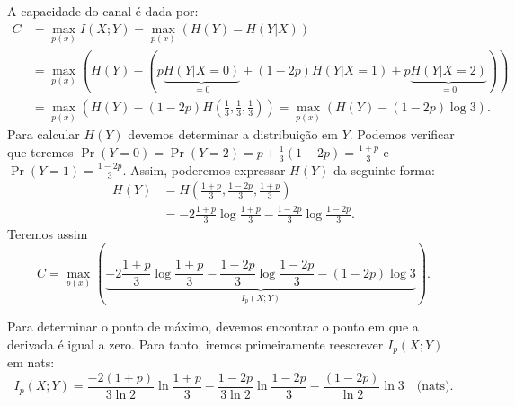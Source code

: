 \begin{questions}
\begin{solution}
A capacidade do canal é dada por:
\begin{align}
C &= \max_{p(x)} I(X;Y) = \max_{p(x)} \left( H(Y) - H(Y|X) \right) \nonumber \\
  &= \max_{p(x)} \left( H(Y) - \left( p\underbrace{H(Y|X=0)}_{=0} + (1-2p)H(Y|X=1) + p\underbrace{H(Y|X=2)}_{=0} \right) \right) \nonumber \\
  &= \max_{p(x)} \left( H(Y) - (1-2p) H\left(\frac{1}{3},\frac{1}{3},\frac{1}{3}\right) \right) = \max_{p(x)} \left( H(Y) - (1-2p) \log 3 \right) .
\end{align}
Para calcular $H(Y)$ devemos determinar a distribuição em $Y$. Podemos verificar que
teremos $\Pr(Y=0)=\Pr(Y=2)=p+\frac{1}{3}(1-2p)=\frac{1+p}{3}$ e $\Pr(Y=1)=\frac{1-2p}{3}$. Assim, poderemos
expressar $H(Y)$ da seguinte forma:
\begin{align}
H(Y) &= H\left( \frac{1+p}{3}, \frac{1-2p}{3}, \frac{1+p}{3} \right) \nonumber \\
     &= - 2 \frac{1+p}{3} \log \frac{1+p}{3} - \frac{1-2p}{3} \log \frac{1-2p}{3} .
\end{align}
Teremos assim
\begin{equation}
C = \max_{p(x)} \left( \underbrace{ - 2 \frac{1+p}{3} \log \frac{1+p}{3} - \frac{1-2p}{3} \log \frac{1-2p}{3} - (1-2p) \log 3 }_{I_p(X;Y)} \right) .
\end{equation}

Para determinar o ponto de máximo, devemos encontrar o ponto em que a derivada é igual a zero. Para tanto, iremos
primeiramente reescrever $I_p(X;Y)$ em nats:
\begin{equation}
I_p(X;Y) = \frac{-2(1+p)}{3 \ln 2} \ln \frac{1+p}{3} - \frac{1-2p}{3\ln2} \ln \frac{1-2p}{3} - \frac{(1-2p)}{\ln 2} \ln 3 \quad \text{(nats)}.
\end{equation}


\end{solution}
\end{questions}
